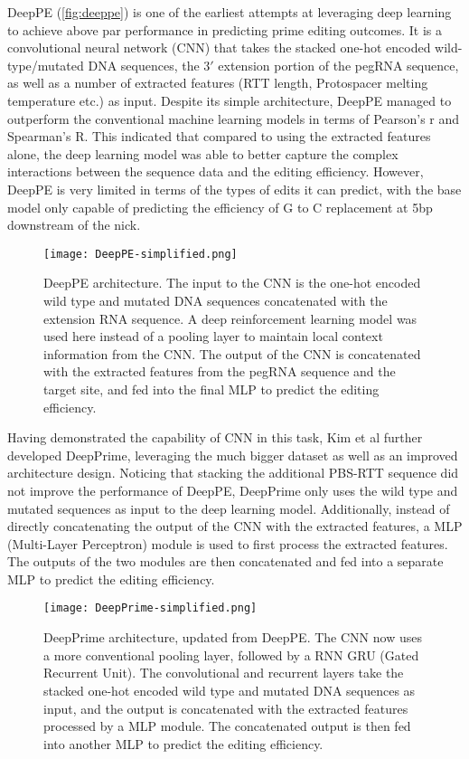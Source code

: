 DeepPE (\autoref{fig:deeppe}) is one of the earliest attempts at leveraging deep learning to achieve above par performance in predicting prime editing outcomes\cite{kimPredictingEfficiencyPrime2021}. It is a convolutional neural network (CNN) that takes the stacked one-hot encoded wild-type/mutated DNA sequences, the $3'$ extension portion of the pegRNA sequence, as well as a number of extracted features (RTT length, Protospacer melting temperature etc.) as input. Despite its simple architecture, DeepPE managed to outperform the conventional machine learning models in terms of Pearson's r and Spearman's R. This indicated that compared to using the extracted features alone, the deep learning model was able to better capture the complex interactions between the sequence data and the editing efficiency. However, DeepPE is very limited in terms of the types of edits it can predict, with the base model only capable of predicting the efficiency of G to C replacement at 5bp downstream of the nick. 

\begin{figure}
    \centering
    \texttt{[image: DeepPE-simplified.png]}
    \caption[DeepPE architecture]{DeepPE architecture. The input to the CNN is the one-hot encoded wild type and mutated DNA sequences concatenated with the extension RNA sequence. A deep reinforcement learning model was used here instead of a pooling layer to maintain local context information from the CNN. The output of the CNN is concatenated with the extracted features from the pegRNA sequence and the target site, and fed into the final MLP to predict the editing efficiency. }
    \label{fig:deeppe}
\end{figure}


Having demonstrated the capability of CNN in this task, Kim et al further developed DeepPrime, leveraging the much bigger dataset as well as an improved architecture design\cite{yuPredictionEfficienciesDiverse2023}.
Noticing that stacking the additional PBS-RTT sequence did not improve the performance of DeepPE, DeepPrime only uses the wild type and mutated sequences as input to the deep learning model. Additionally, instead of directly concatenating the output of the CNN with the extracted features, a MLP (Multi-Layer Perceptron) module is used to first process the extracted features.
The outputs of the two modules are then concatenated and fed into a separate MLP to predict the editing efficiency.

\begin{figure}
    \centering
    \texttt{[image: DeepPrime-simplified.png]}
    \caption[DeepPrime architecture]{DeepPrime architecture, updated from DeepPE. The CNN now uses a more conventional pooling layer, followed by a RNN GRU (Gated Recurrent Unit). The convolutional and recurrent layers take the stacked one-hot encoded wild type and mutated DNA sequences as input, and the output is concatenated with the extracted features processed by a MLP module. The concatenated output is then fed into another MLP to predict the editing efficiency.}
    \label{fig:deepprime}
\end{figure}


